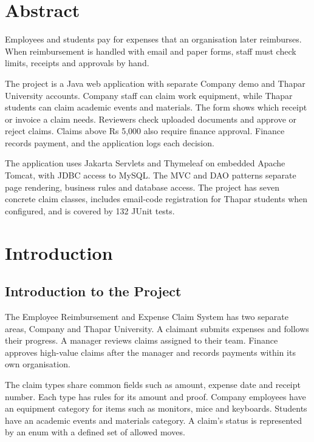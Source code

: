 \documentclass[12pt,a4paper]{report}
\begin{document}
\chapter*{Abstract}

Employees and students pay for expenses that an organisation later reimburses. When reimbursement is handled with email and paper forms, staff must check limits, receipts and approvals by hand.

The project is a Java web application with separate Company demo and Thapar University accounts. Company staff can claim work equipment, while Thapar students can claim academic events and materials. The form shows which receipt or invoice a claim needs. Reviewers check uploaded documents and approve or reject claims. Claims above Rs 5,000 also require finance approval. Finance records payment, and the application logs each decision.

The application uses Jakarta Servlets and Thymeleaf on embedded Apache Tomcat, with JDBC access to MySQL. The MVC and DAO patterns separate page rendering, business rules and database access. The project has seven concrete claim classes, includes email-code registration for Thapar students when configured, and is covered by 132 JUnit tests.

\tableofcontents

\clearpage
{}

\chapter{Introduction}

\section{Introduction to the Project}

The Employee Reimbursement and Expense Claim System has two separate areas, Company and Thapar University. A claimant submits expenses and follows their progress. A manager reviews claims assigned to their team. Finance approves high-value claims after the manager and records payments within its own organisation.

The claim types share common fields such as amount, expense date and receipt number. Each type has rules for its amount and proof. Company employees have an equipment category for items such as monitors, mice and keyboards. Students have an academic events and materials category. A claim's status is represented by an enum with a defined set of allowed moves.
\end{document}
